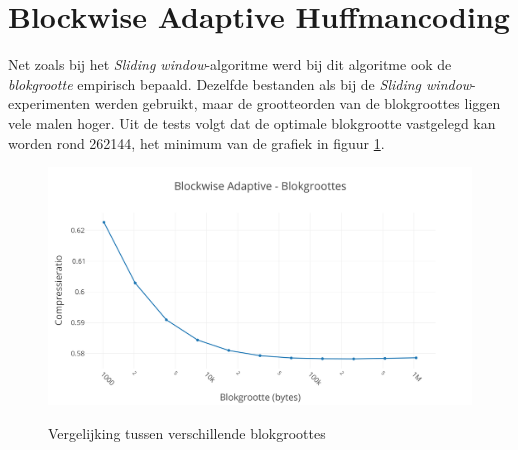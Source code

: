 \section{Blockwise Adaptive Huffmancoding}

Net zoals bij het \emph{Sliding window}-algoritme werd bij dit algoritme ook de \emph{blokgrootte} empirisch bepaald. Dezelfde bestanden als bij de \emph{Sliding window}-experimenten werden gebruikt, maar de grootteorden van de blokgroottes liggen vele malen hoger. Uit de tests volgt dat de optimale blokgrootte vastgelegd kan worden rond \SI{262144}{\byte}, het minimum van de grafiek in figuur \ref{fig:blocksize}.

\begin{figure}[h]
	\centering
	\includegraphics[width=0.9\linewidth]{resources/blockwise-size.png}
	\label{fig:blocksize}
	\caption{Vergelijking tussen verschillende blokgroottes}
\end{figure}